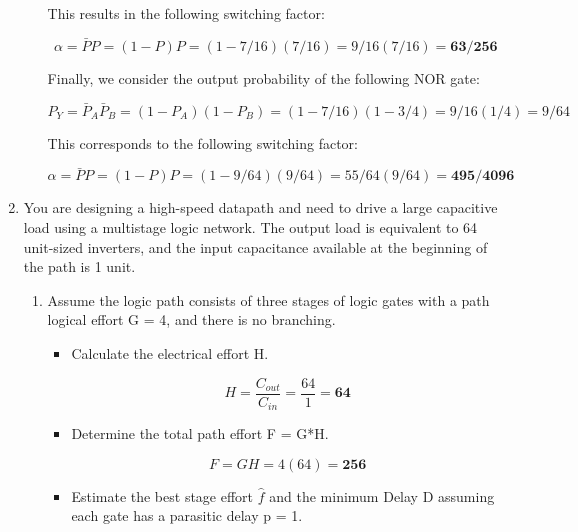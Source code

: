 \documentclass[fleqn]{article}
\begin{document}
\begin{enumerate}
\begin{enumerate}
			This results in the following switching factor:
			
			\begin{equation*}
				\alpha = \bar{P}P = (1 - P)P = (1 - 7/16)(7/16) = 9/16(7/16) = \mathbf{63/256}
			\end{equation*}
			
			Finally, we consider the output probability of the following NOR gate:
			
			\begin{equation*}
				P_Y = \bar{P}_A\bar{P}_B = (1 - P_A)(1 - P_B) = (1 - 7/16)(1 - 3/4) = 9/16(1/4) = 9/64
			\end{equation*}
			
			This corresponds to the following switching factor:
			
			\begin{equation*}
				\alpha = \bar{P}P = (1 - P)P = (1 - 9/64)(9/64) = 55/64(9/64) = \mathbf{495/4096}
			\end{equation*}
			
		\end{enumerate}

		\item You are designing a high-speed datapath and need to drive a large capacitive load using a multistage logic network. The output load is equivalent to 64 unit-sized inverters, and the input capacitance available at the beginning of the path is 1 unit.
			
		\begin{enumerate}
			\item Assume the logic path consists of three stages of logic gates with a path logical effort G = 4, and there is no branching.
				
			\begin{itemize}
				\item Calculate the electrical effort H.
					
				\begin{equation*}
					H = \frac{C_{out}}{C_{in}} = \frac{64}{1} = \mathbf{64}
				\end{equation*}
					
				\item Determine the total path effort F = G*H.
					
				\begin{equation*}
					F = GH = 4(64) = \mathbf{256}
				\end{equation*}
					
				\item Estimate the best stage effort $\hat{f}$ and the minimum Delay D assuming each gate has a parasitic delay p = 1.
					

\end{itemize}
\end{enumerate}
\end{enumerate}
\end{document}
